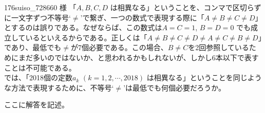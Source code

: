 \begin{thm}{176}{}{suiso\_728660 様}
 「$A, B, C, D$ は相異なる」ということを、コンマで区切らずに一文字ずつ不等号`$\neq$'で繋ぎ、一つの数式で表現する際に「$A\neq B\neq C\neq D$」とするのは誤りである。なぜならば、この数式は$A=C=1$, $B=D=0$ でも成立しているといえるからである。正しくは「$A\neq B\neq C\neq D\neq A\neq C\neq B\neq D$」であり、最低でも$\neq$が7個必要である。この場合、$B\neq C$を2回参照しているためにまだ多いのではないか、と思われるかもしれないが、しかし6本以下で表すことは不可能である。\\
 では、「2018個の定数$a_k$ $(k=1, 2, \cdots, 2018)$ は相異なる」ということを同じような方法で表現するために、不等号`$\neq$'は最低でも何個必要だろうか。
\end{thm}

ここに解答を記述。